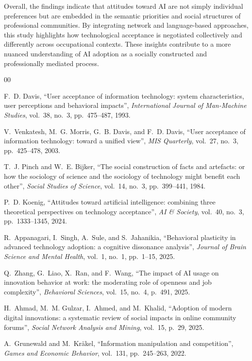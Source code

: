 \documentclass[conference]{IEEEtran}
\begin{document}
Overall, the findings indicate that attitudes toward AI are not simply individual preferences but are embedded in the semantic priorities and social structures of professional communities. By integrating network and language-based approaches, this study highlights how technological acceptance is negotiated collectively and differently across occupational contexts. These insights contribute to a more nuanced understanding of AI adoption as a socially constructed and professionally mediated process.

\clearpage

\begin{thebibliography}{00}

F.~D. Davis,
``User acceptance of information technology: system characteristics, user perceptions and behavioral impacts'',
\emph{International Journal of Man-Machine Studies}, vol.~38, no.~3, pp.~475--487, 1993.

V.~Venkatesh, M.~G. Morris, G.~B. Davis, and F.~D. Davis,
``User acceptance of information technology: toward a unified view'',
\emph{MIS Quarterly}, vol.~27, no.~3, pp.~425--478, 2003.

T.~J. Pinch and W.~E. Bijker,
``The social construction of facts and artefacts: or how the sociology of science and the sociology of technology might benefit each other'',
\emph{Social Studies of Science}, vol.~14, no.~3, pp.~399--441, 1984.

P.~D. Koenig,
``Attitudes toward artificial intelligence: combining three theoretical perspectives on technology acceptance'',
\emph{AI \& Society}, vol.~40, no.~3, pp.~1333--1345, 2024.

R.~Appanagari, I.~Singh, A.~Sule, and S.~Jahanikia,
``Behavioral plasticity in advanced technology adoption: a cognitive dissonance analysis'',
\emph{Journal of Brain Science and Mental Health}, vol.~1, no.~1, pp.~1--15, 2025.

Q.~Zhang, G.~Liao, X.~Ran, and F.~Wang,
``The impact of AI usage on innovation behavior at work: the moderating role of openness and job complexity'',
\emph{Behavioral Sciences}, vol.~15, no.~4, p.~491, 2025.

H.~Ahmad, M.~M. Gulzar, I.~Ahmed, and M.~Khalid,
``Adoption of modern digital innovations: a systematic review of social impacts in online community forums'',
\emph{Social Network Analysis and Mining}, vol.~15, p.~29, 2025.

A.~Grunewald and M.~Kräkel,
``Information manipulation and competition'',
\emph{Games and Economic Behavior}, vol.~131, pp.~245--263, 2022.


\end{thebibliography}
\end{document}
